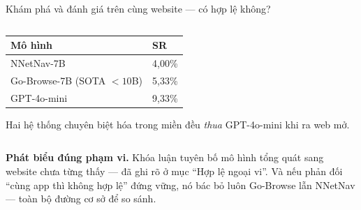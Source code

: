 \begin{frame}{Khám phá và đánh giá trên cùng website --- có hợp lệ không?}
\begin{columns}[t]
\begin{column}{0.49\textwidth}
      \vspace{-0.05cm}
      \centering
      \begin{tabular}{@{}L{3.1cm} R{1.3cm}@{}}
        \toprule
        \textbf{Mô hình} & \textbf{SR} \\
        \midrule
        NNetNav-7B & 4,00\% \\
        Go-Browse-7B (SOTA ${<}10$B) & 5,33\% \\
        GPT-4o-mini & 9,33\% \\
        \bottomrule
      \end{tabular}\par
      \vspace{0.08cm}
      \raggedright
      \scriptsize Hai hệ thống chuyên biệt hóa trong miền đều \emph{thua} GPT-4o-mini
      khi ra web mở.
    \end{column}
  \end{columns}
  \vspace{0.1cm}
  {\scriptsize\textbf{Phát biểu đúng phạm vi.} Khóa luận  tuyên bố mô hình
  tổng quát sang website chưa từng thấy --- đã ghi rõ ở mục ``Hợp lệ ngoại vi''. Và nếu
  phản đối ``cùng app thì không hợp lệ'' đứng vững, nó bác bỏ luôn Go-Browse lẫn
  NNetNav --- toàn bộ đường cơ sở để so sánh.\par}
\end{frame}

